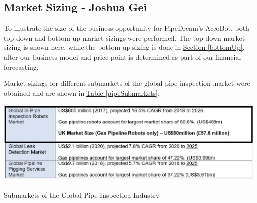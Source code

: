 \documentclass[11pt]{article}		%
\newcommand{\supercite}[1]{\textsuperscript{\cite{#1}}}		%
\newcommand{\tableref}[1]{\hyperref[#1]{Table \ref*{#1}}}     %
\newcommand{\sectref}[1]{\hyperref[#1]{Section \ref*{#1}}}     %
\begin{document}
        \subsection[Market Sizing]{Market Sizing - Joshua Gei}
        To illustrate the size of the business opportunity for PipeDream’s AccoBot, both top-down and bottom-up market sizings were performed. The top-down market sizing is shown here, while the bottom-up sizing is done in \sectref{bottomUp}, after our business model and price point is determined as part of our financial forecasting. 
        
        Market sizings for different submarkets of the global pipe inspection market were obtained and are shown in \tableref{pipeSubmarkets}. 
    	\begin{table}[h]
			\centering
			\includegraphics[width=\textwidth]{Market Sizing.jpg}
			\caption{Submarkets of the Global Pipe Inspection Industry\supercite{inpipemkt}\supercite{leakmkt}\supercite{pigmkt}}
			\label{pipeSubmarkets}
 		\end{table}
 
\end{document}
